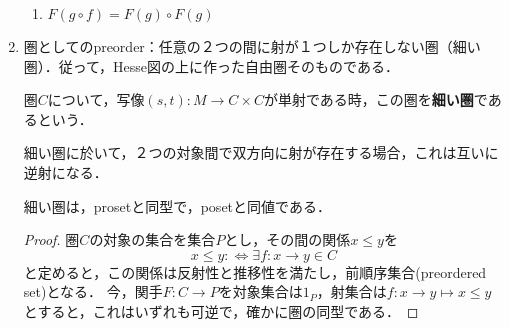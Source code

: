 \documentclass[uplatex, 12pt, dvipdfmx]{jsarticle}
\begin{document}
\begin{enumerate}
\begin{definition}[Functor]
\begin{enumerate}[(1)]
            \item $F(g\circ f)=F(g)\circ F(g)$
        \end{enumerate}
    \end{definition}
    \item 圏としてのpreorder：任意の２つの間に射が１つしか存在しない圏（細い圏）．従って，Hesse図の上に作った自由圏そのものである．
    \begin{definition*}
        圏$C$について，写像$(s,t):M\to C\times C$が単射である時，この圏を\textbf{細い圏}であるという．
    \end{definition*}
    \begin{corollary*}
        細い圏に於いて，２つの対象間で双方向に射が存在する場合，これは互いに逆射になる．
    \end{corollary*}
    \begin{proposition*}
        細い圏は，prosetと同型で，posetと同値である．
    \end{proposition*}
    \begin{proof}
        圏$C$の対象の集合を集合$P$とし，その間の関係$x\le y$を
        \[ x\le y:\Leftrightarrow \exists f:x\to y\in C \]
        と定めると，この関係は反射性と推移性を満たし，前順序集合(preordered set)となる．
        今，関手$F:C\to P$を対象集合は$1_P$，射集合は$f:x\to y\mapsto x\le y$とすると，これはいずれも可逆で，確かに圏の同型である．
    

\end{proof}
\end{enumerate}
\end{document}

